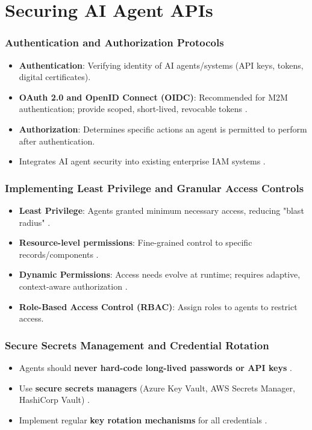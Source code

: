 \documentclass{beamer}       %
\begin{document}
\section{Securing AI Agent APIs}

\begin{frame}
    \frametitle{Authentication and Authorization Protocols}
    \begin{itemize}
        \item \textbf{Authentication}: Verifying identity of AI agents/systems (API keys, tokens, digital certificates).
        \item \textbf{OAuth 2.0 and OpenID Connect (OIDC)}: Recommended for M2M authentication; provide scoped, short-lived, revocable tokens .
        \item \textbf{Authorization}: Determines specific actions an agent is permitted to perform after authentication.
        \item Integrates AI agent security into existing enterprise IAM systems .
    \end{itemize}
\end{frame}

\begin{frame}
    \frametitle{Implementing Least Privilege and Granular Access Controls}
    \begin{itemize}
        \item \textbf{Least Privilege}: Agents granted minimum necessary access, reducing "blast radius" .
        \item \textbf{Resource-level permissions}: Fine-grained control to specific records/components .
        \item \textbf{Dynamic Permissions}: Access needs evolve at runtime; requires adaptive, context-aware authorization .
        \item \textbf{Role-Based Access Control (RBAC)}: Assign roles to agents to restrict access.
    \end{itemize}
\end{frame}

\begin{frame}
    \frametitle{Secure Secrets Management and Credential Rotation}
    \begin{itemize}
        \item Agents should \textbf{never hard-code long-lived passwords or API keys} .
        \item Use \textbf{secure secrets managers} (Azure Key Vault, AWS Secrets Manager, HashiCorp Vault) .
        \item Implement regular \textbf{key rotation mechanisms} for all credentials .
    \end{itemize}
\end{frame}
\end{document}
